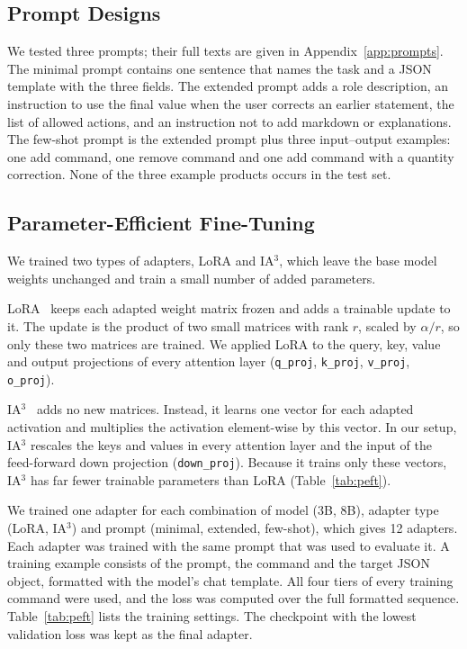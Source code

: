 \documentclass[journal,article,submit,pdftex,moreauthors]{Definitions/mdpi}
\begin{document}
\subsection{Prompt Designs}\label{sec:prompts}

We tested three prompts; their full texts are given in Appendix~\ref{app:prompts}. The minimal prompt contains one sentence that names the task and a JSON template with the three fields. The extended prompt adds a role description, an instruction to use the final value when the user corrects an earlier statement, the list of allowed actions, and an instruction not to add markdown or explanations. The few-shot prompt is the extended prompt plus three input--output examples: one add command, one remove command and one add command with a quantity correction. None of the three example products occurs in the test set.

\subsection{Parameter-Efficient Fine-Tuning}\label{sec:peft}

We trained two types of adapters, LoRA and IA$^3$, which leave the base model weights unchanged and train a small number of added parameters.

LoRA~\citep{hu2022lora} keeps each adapted weight matrix frozen and adds a trainable update to it. The update is the product of two small matrices with rank $r$, scaled by $\alpha / r$, so only these two matrices are trained. We applied LoRA to the query, key, value and output projections of every attention layer (\texttt{q\_proj}, \texttt{k\_proj}, \texttt{v\_proj}, \texttt{o\_proj}).

IA$^3$~\citep{liu2022fewshot} adds no new matrices. Instead, it learns one vector for each adapted activation and multiplies the activation element-wise by this vector. In our setup, IA$^3$ rescales the keys and values in every attention layer and the input of the feed-forward down projection (\texttt{down\_proj}). Because it trains only these vectors, IA$^3$ has far fewer trainable parameters than LoRA (Table~\ref{tab:peft}).

We trained one adapter for each combination of model (3B, 8B), adapter type (LoRA, IA$^3$) and prompt (minimal, extended, few-shot), which gives 12 adapters. Each adapter was trained with the same prompt that was used to evaluate it. A training example consists of the prompt, the command and the target JSON object, formatted with the model's chat template. All four tiers of every training command were used, and the loss was computed over the full formatted sequence. Table~\ref{tab:peft} lists the training settings. The checkpoint with the lowest validation loss was kept as the final adapter.
\end{document}

